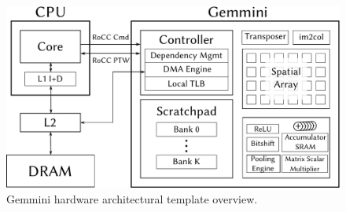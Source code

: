 \begin{figure}[t]
    \centering
    \includegraphics[width=0.9\linewidth]{fig/systolic_arch_system.pdf}
    \caption{Gemmini hardware architectural template overview.}
    \vspace{-0.3cm}
    \label{fig:arch-template}
    \vspace{-0.1in}
\end{figure}





